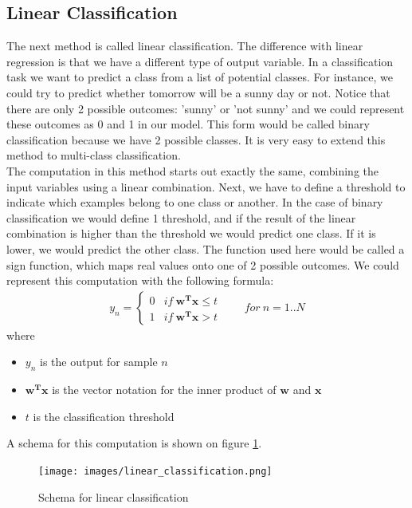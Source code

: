 \subsection{Linear Classification}
\label{subsec:glm-linear-classification}
The next method is called linear classification\cite{caltechmachinelearning}\cite{wikiclassification}. The difference with linear regression is that we have a different type of output variable. In a classification task we want to predict a class from a list of potential classes. For instance, we could try to predict whether tomorrow will be a sunny day or not. Notice that there are only 2 possible outcomes: 'sunny' or 'not sunny' and we could represent these outcomes as 0 and 1 in our model. This form would be called binary classification because we have 2 possible classes. It is very easy to extend this method to multi-class classification.\\
The computation in this method starts out exactly the same, combining the input variables using a linear combination. Next, we have to define a threshold to indicate which examples belong to one class or another. In the case of binary classification we would define 1 threshold, and if the result of the linear combination is higher than the threshold we would predict one class. If it is lower, we would predict the other class. The function used here would be called a sign function, which maps real values onto one of 2 possible outcomes. We could represent this computation with the following formula: 
\begin{equation}
\begin{split}
y_{n} =
\begin{cases} 
0 & if\ \bm{w^{T}x} \leq t \\
1 & if\ \bm{w^{T}x} > t 
\end{cases}
\qquad for\ n=1..N
\end{split}
\end{equation}
where
\begin{itemize}
	\item $y_{n}$ is the output for sample $n$
	\item $\bm{w^{T}x}$ is the vector notation for the inner product of $\bm{w}$ and $\bm{x}$
	\item $t$ is the classification threshold
\end{itemize}
A schema for this computation is shown on figure \ref{fig:glm-linear-classification}.
\begin{figure}
	\centering
	\texttt{[image: images/linear\_classification.png]}
	\caption{Schema for linear classification}
	\label{fig:glm-linear-classification}
\end{figure}
